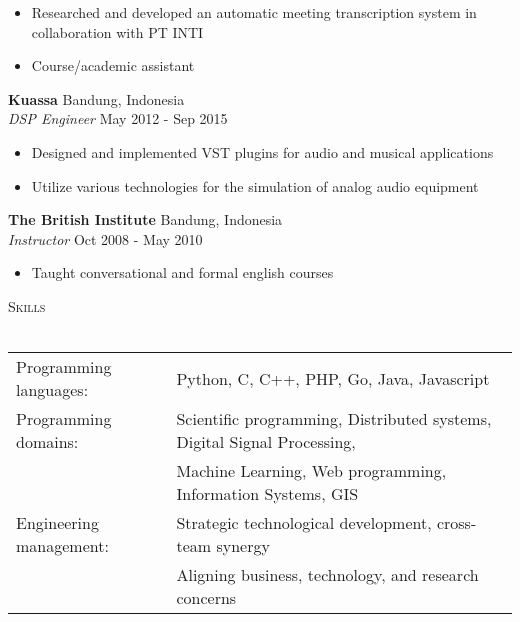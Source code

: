 \documentclass[a4paper]{article}
\newcommand{\lineunder} {
    \vspace*{-8pt} \\
    \hspace*{-18pt} \hrulefill \\
}
\newcommand{\header} [1] {
    {\hspace*{-18pt}\vspace*{6pt} \textsc{#1}}
    \vspace*{-6pt} \lineunder
}
\begin{document}
\vspace{-3mm}
\begin{itemize} \itemsep 1pt
  \item Researched and developed an automatic meeting transcription system in
    collaboration with PT INTI
  \item Course/academic assistant
\end{itemize}
\textbf{Kuassa} \hfill Bandung, Indonesia\\
\textit{DSP Engineer} \hfill May 2012 - Sep 2015\\
\vspace{-3mm}
\begin{itemize} \itemsep 1pt
	\item Designed and implemented VST plugins for audio and musical applications
  \item Utilize various technologies for the simulation of analog audio
    equipment
\end{itemize}
\textbf{The British Institute} \hfill Bandung, Indonesia\\
\textit{Instructor} \hfill Oct 2008 - May 2010\\
\vspace{-3mm}
\begin{itemize} \itemsep 1pt
	\item Taught conversational and formal english courses
\end{itemize}
\vspace{3mm}

\header{Skills}
\vspace{3mm}
\begin{tabular}{ l l }
\vspace{3mm}
	Programming languages: & Python, C, C++, PHP, Go, Java, Javascript \\
	Programming domains:   & Scientific programming, Distributed systems, 
  Digital Signal Processing, \\
\vspace{3mm}
                         & Machine Learning, Web programming, Information
                         Systems, GIS \\
  Engineering management:& Strategic technological development, cross-team
                        synergy\\
\vspace{3mm}
                         & Aligning business, technology, and research concerns
                         \\
\end{tabular}
\vspace{5mm}
\end{document}
